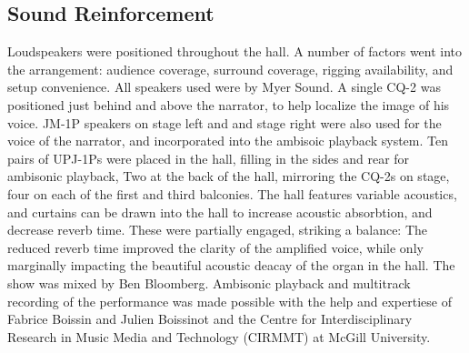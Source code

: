 \subsection{Sound Reinforcement}
\label{sec:sound-reinforcement}
Loudspeakers were positioned throughout the hall. A number of factors
went into the arrangement: audience coverage, surround coverage,
rigging availability, and setup convenience. All speakers used were by
Myer Sound. A single CQ-2
was positioned just behind and above the narrator, to help localize
the image of his voice.  JM-1P speakers on stage left and and stage
right were also used for the voice of the narrator, and incorporated
into the ambisoic playback system. Ten pairs of UPJ-1Ps were placed in
the hall, filling in the sides and rear for ambisonic playback, Two at
the back of the hall, mirroring the CQ-2s on stage, four on each of
the first and third balconies.  The hall features variable acoustics,
and curtains can be drawn into the hall to increase acoustic
absorbtion, and decrease reverb time. These were partially engaged,
striking a balance: The reduced reverb time improved the clarity of
the amplified voice, while only marginally impacting the beautiful
acoustic deacay of the organ in the hall. The show was mixed by Ben
Bloomberg. Ambisonic playback and multitrack recording of the
performance was made possible with the help and expertiese of Fabrice
Boissin and Julien Boissinot and the Centre for Interdisciplinary
Research in Music Media and Technology (CIRMMT) at McGill University.








